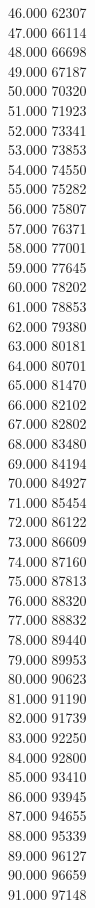 { 46.000	62307 \\
 47.000	66114 \\
 48.000	66698 \\
 49.000	67187 \\
 50.000	70320 \\
 51.000	71923 \\
 52.000	73341 \\
 53.000	73853 \\
 54.000	74550 \\
 55.000	75282 \\
 56.000	75807 \\
 57.000	76371 \\
 58.000	77001 \\
 59.000	77645 \\
 60.000	78202 \\
 61.000	78853 \\
 62.000	79380 \\
 63.000	80181 \\
 64.000	80701 \\
 65.000	81470 \\
 66.000	82102 \\
 67.000	82802 \\
 68.000	83480 \\
 69.000	84194 \\
 70.000	84927 \\
 71.000	85454 \\
 72.000	86122 \\
 73.000	86609 \\
 74.000	87160 \\
 75.000	87813 \\
 76.000	88320 \\
 77.000	88832 \\
 78.000	89440 \\
 79.000	89953 \\
 80.000	90623 \\
 81.000	91190 \\
 82.000	91739 \\
 83.000	92250 \\
 84.000	92800 \\
 85.000	93410 \\
 86.000	93945 \\
 87.000	94655 \\
 88.000	95339 \\
 89.000	96127 \\
 90.000	96659 \\
 91.000	97148 \\
}
